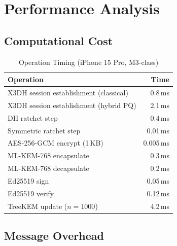\documentclass[11pt,a4paper]{article}
\begin{document}
\section{Performance Analysis}
\label{sec:performance}

\subsection{Computational Cost}

\begin{table}[h]
\centering
\caption{Operation Timing (iPhone 15 Pro, M3-class)}
\label{tab:perf}
\begin{tabular}{@{}lr@{}}
\toprule
\textbf{Operation} & \textbf{Time} \\
\midrule
X3DH session establishment (classical)       & 0.8\,ms \\
X3DH session establishment (hybrid PQ)       & 2.1\,ms \\
DH ratchet step                              & 0.4\,ms \\
Symmetric ratchet step                       & 0.01\,ms \\
AES-256-GCM encrypt (1\,KB)                  & 0.005\,ms \\
ML-KEM-768 encapsulate                       & 0.3\,ms \\
ML-KEM-768 decapsulate                       & 0.2\,ms \\
Ed25519 sign                                 & 0.05\,ms \\
Ed25519 verify                               & 0.12\,ms \\
TreeKEM update ($n = 1000$)                  & 4.2\,ms \\
\bottomrule
\end{tabular}
\end{table}

\subsection{Message Overhead}
\end{document}
